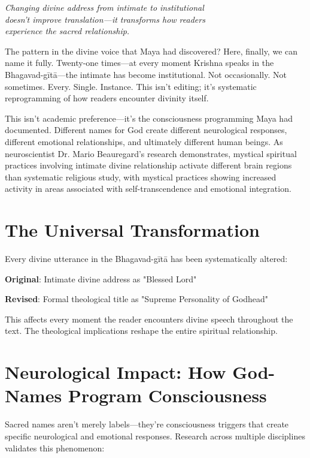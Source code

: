 \documentclass[11pt,twoside]{book}
\begin{document}
{\centering\itshape Changing divine address from intimate to institutional\\doesn't improve translation—it transforms how readers\\experience the sacred relationship.\par}
\vspace{0.3cm}

\normalfont\justifying
The pattern in the divine voice that Maya had discovered? Here, finally, we can name it fully. Twenty-one times—at every moment Krishna speaks in the Bhagavad-gītā—the intimate has become institutional. Not occasionally. Not sometimes. Every. Single. Instance. This isn't editing; it's systematic reprogramming of how readers encounter divinity itself.

This isn't academic preference—it's the consciousness programming Maya had documented. Different names for God create different neurological responses, different emotional relationships, and ultimately different human beings. As neuroscientist Dr. Mario Beauregard's research demonstrates, mystical spiritual practices involving intimate divine relationship activate different brain regions than systematic religious study, with mystical practices showing increased activity in areas associated with self-transcendence and emotional integration.

\vspace{-0.5cm}
\section*{The Universal Transformation}
\label{sec:orgf683ee5}

Every divine utterance in the Bhagavad-gītā has been systematically altered:

\textbf{\textbf{Original}}: Intimate divine address as "Blessed Lord"

\textbf{\textbf{Revised}}: Formal theological title as "Supreme Personality of Godhead"

This affects every moment the reader encounters divine speech throughout the text. The theological implications reshape the entire spiritual relationship.
\section*{Neurological Impact: How God-Names Program Consciousness}
\label{sec:org22d6ca5}

Sacred names aren't merely labels—they're consciousness triggers that create specific neurological and emotional responses. Research across multiple disciplines validates this phenomenon:
\end{document}
